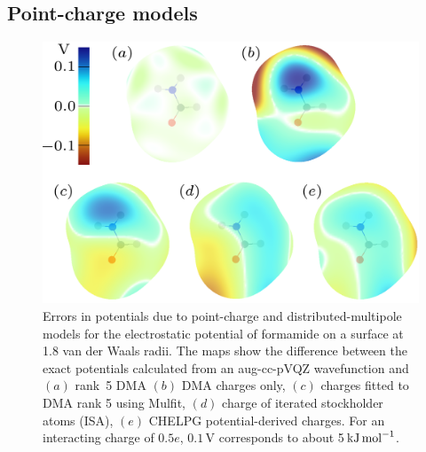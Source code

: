 \documentclass[12pt,txfonts]{paper}
\newcommand\kJpermol{\ensuremath{\,{\rm kJ\,mol}^{-1}}}
\begin{document}
\subsection{Point-charge models}
\label{subsec:ptcharge}

\begin{figure}[tb]
\begin{center}
\includegraphics[scale=0.5,viewport=200 0 600 500]{pictures/point-charge-models.pdf}
\end{center}
\caption{Errors in potentials due to point-charge and
  distributed-multipole models for the 
electrostatic potential of formamide on a surface at 1.8 van der Waals
radii. The maps show the difference between the exact potentials
calculated from an aug-cc-pVQZ wavefunction and $(a)$ rank~5 DMA $(b)$
DMA charges only, $(c)$ charges fitted to DMA rank 5 using {\sc
  Mulfit}, $(d)$ charge of iterated stockholder atoms (ISA), $(e)$
CHELPG potential-derived charges. For an interacting charge of $0.5e$,
$0.1\,$V corresponds to about 5\kJpermol.}
\label{fig:formamide}
\end{figure}
\end{document}
